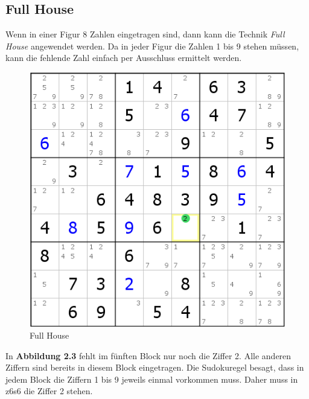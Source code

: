 \newpage
\subsection{Full House}
\label{Full_House}
Wenn in einer Figur 8 Zahlen eingetragen sind, dann kann die Technik \textit{Full House} angewendet werden. Da in jeder Figur die Zahlen 1 bis 9 stehen müssen, kann die fehlende Zahl einfach per Ausschluss ermittelt werden.\\

\begin{figure}[h]
\begin{center}
\includegraphics{./img/full_house.png}
\caption{Full House}
\end{center}
\end{figure}

In \textbf{Abbildung 2.3} fehlt im fünften Block nur noch die Ziffer 2. Alle anderen Ziffern sind bereits in diesem Block eingetragen. Die Sudokuregel besagt, dass in jedem Block die Ziffern 1 bis 9 jeweils einmal vorkommen muss. Daher muss in z6s6 die Ziffer 2 stehen.